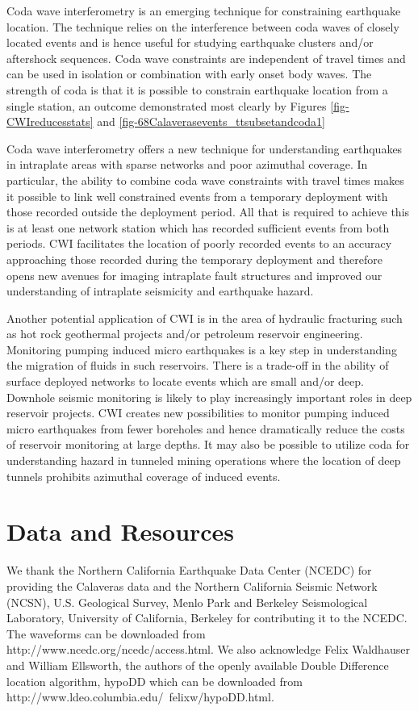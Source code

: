 \documentclass[extra, onecolumn, doublespacing]{gji}
\begin{document}
Coda wave interferometry is an emerging technique for constraining
earthquake location. The technique relies on the interference
between coda waves of closely located events and is hence useful for
studying earthquake clusters and/or aftershock sequences. Coda wave
constraints are independent of travel times and can be used in
isolation or combination with early onset body waves. The strength
of coda is that it is possible to constrain earthquake location from
a single station, an outcome demonstrated most clearly by Figures
\ref{fig-CWIreducesstats} and
\ref{fig-68Calaverasevents_ttsubsetandcoda1}

Coda wave interferometry offers a new technique for understanding
earthquakes in intraplate areas with sparse networks and poor
azimuthal coverage. In particular, the ability to combine coda wave
constraints with travel times makes it possible to link well
constrained events from a temporary deployment with those recorded
outside the deployment period. All that is required to achieve this
is at least one network station which has recorded sufficient events
from both periods. CWI facilitates the location of poorly recorded
events to an accuracy approaching those recorded during the
temporary deployment and therefore opens new avenues for imaging
intraplate fault structures and improved our understanding of
intraplate seismicity and earthquake hazard.

Another potential application of CWI is in the area of hydraulic
fracturing such as hot rock geothermal projects and/or petroleum
reservoir engineering. Monitoring pumping induced micro earthquakes
is a key step in understanding the migration of fluids in such
reservoirs. There is a trade-off in the ability of surface deployed
networks to locate events which are small and/or deep. Downhole
seismic monitoring is likely to play increasingly important roles in
deep reservoir projects. CWI creates new possibilities to monitor
pumping induced micro earthquakes from fewer boreholes and hence
dramatically reduce the costs of reservoir monitoring at large
depths. It may also be possible to utilize coda for understanding
hazard in tunneled mining operations where the location of deep
tunnels prohibits azimuthal coverage of induced events.

\section{Data and Resources}
We thank the Northern California Earthquake Data Center (NCEDC) for
providing the Calaveras data and the Northern California Seismic
Network (NCSN), U.S. Geological Survey, Menlo Park and Berkeley
Seismological Laboratory, University of California, Berkeley for
contributing it to the NCEDC. The waveforms can be downloaded from
http://www.ncedc.org/ncedc/access.html. We also acknowledge Felix
Waldhauser and William Ellsworth, the authors of the openly
available Double Difference location algorithm, hypoDD which can be
downloaded from http://www.ldeo.columbia.edu/~felixw/hypoDD.html.
\end{document}

